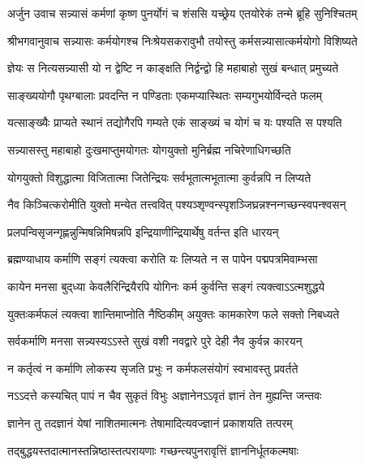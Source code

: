 {अर्जुन उवाच}
\twolineshloka
{सन्न्यासं कर्मणां कृष्ण पुनर्योगं च शंससि}
{यच्छ्रेय एतयोरेकं तन्मे ब्रूहि सुनिश्चितम्}%

{श्रीभगवानुवाच}
\twolineshloka
{सन्न्यासः कर्मयोगश्च निःश्रेयसकरावुभौ}
{तयोस्तु कर्मसन्न्यासात्कर्मयोगो विशिष्यते}%

\twolineshloka
{ज्ञेयः स नित्यसन्न्यासी यो न द्वेष्टि न काङ्क्षति}
{निर्द्वन्द्वो हि महाबाहो सुखं बन्धात् प्रमुच्यते}%

\twolineshloka
{साङ्ख्ययोगौ पृथग्बालाः प्रवदन्ति न पण्डिताः}
{एकमप्यास्थितः सम्यगुभयोर्विन्दते फलम्}%

\twolineshloka
{यत्साङ्ख्यैः प्राप्यते स्थानं तद्योगैरपि गम्यते}
{एकं साङ्ख्यं च योगं च यः पश्यति स पश्यति}%

\twolineshloka
{सन्न्यासस्तु महाबाहो दुःखमाप्तुमयोगतः}
{योगयुक्तो मुनिर्ब्रह्म नचिरेणाधिगच्छति}%

\twolineshloka
{योगयुक्तो विशुद्धात्मा विजितात्मा जितेन्द्रियः}
{सर्वभूतात्मभूतात्मा कुर्वन्नपि न लिप्यते}%

\twolineshloka
{नैव किञ्चित्करोमीति युक्तो मन्येत तत्त्ववित्}
{पश्यञ्शृण्वन्स्पृशञ्जिघ्र{\mbox{}न्न}श्नन्गच्छन्स्वपन्श्वसन्}%

\twolineshloka
{प्रलपन्विसृजन्गृह्णन्नुन्मिषन्निमिषन्नपि}
{इन्द्रियाणीन्द्रियार्थेषु वर्तन्त इति धारयन्}%

\twolineshloka
{ब्रह्मण्याधाय कर्माणि सङ्गं त्यक्त्वा करोति यः}
{लिप्यते न स पापेन पद्मपत्रमिवाम्भसा}%

\twolineshloka
{कायेन मनसा बुद्‌ध्या केवलैरिन्द्रियैरपि}
{योगिनः कर्म कुर्वन्ति सङ्गं त्यक्त्वाऽऽत्मशुद्धये}%

\twolineshloka
{युक्तःकर्मफलं त्यक्त्वा शान्तिमाप्नोति नैष्ठिकीम्}
{अयुक्तः कामकारेण फले सक्तो निबध्यते}%

\twolineshloka
{सर्वकर्माणि मनसा सन्न्यस्यऽऽस्ते सुखं वशी}
{नवद्वारे पुरे देही नैव कुर्वन्न कारयन्}%

\twolineshloka
{न कर्तृत्वं न कर्माणि लोकस्य सृजति प्रभुः}
{न कर्मफलसंयोगं स्वभावस्तु प्रवर्तते}%

\twolineshloka
{नऽऽदत्ते कस्यचित् पापं न चैव सुकृतं विभुः}
{अज्ञानेनऽऽवृतं ज्ञानं तेन मुह्यन्ति जन्तवः}%

\twolineshloka
{ज्ञानेन तु तदज्ञानं येषां नाशितमात्मनः}
{तेषामादित्यवज्ज्ञानं प्रकाशयति तत्परम्}%

\twolineshloka
{तद्बुद्धयस्तदात्मानस्तन्निष्ठास्तत्परायणाः}
{गच्छन्त्यपुनरावृत्तिं ज्ञाननिर्धूतकल्मषाः}%

